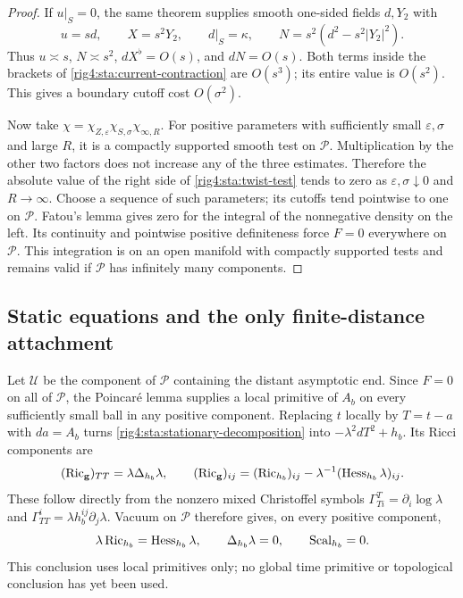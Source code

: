 \begin{proof}
If $u|_S=0$, the same theorem supplies smooth one-sided fields
$d,Y_2$ with
\begin{equation}\label{rig4:sta:zero-lapse-collar}
 u=sd,\qquad X=s^2Y_2,\qquad d|_S=\kappa,
 \qquad N=s^2(d^2-s^2|Y_2|^2).
\end{equation}
Thus $u\asymp s$, $N\asymp s^2$, $dX^\flat=O(s)$, and
$dN=O(s)$. Both terms inside the brackets of
\eqref{rig4:sta:current-contraction} are $O(s^3)$; its entire value is
$O(s^2)$. This gives a boundary cutoff cost $O(\sigma^2)$.

Now take
$\chi=\chi_{Z,\varepsilon}\chi_{S,\sigma}\chi_{\infty,R}$.
For positive parameters with sufficiently small $\varepsilon,\sigma$
and large $R$, it is a compactly supported smooth test on
$\mathcal P$. Multiplication by the other two factors does not
increase any of the three estimates. Therefore the absolute value
of the right side of \eqref{rig4:sta:twist-test} tends to zero as
$\varepsilon,\sigma\downarrow0$ and $R\to\infty$. Choose a sequence
of such parameters; its cutoffs tend pointwise to one on
$\mathcal P$. Fatou's lemma gives zero for the integral of the
nonnegative density on the left. Its continuity and pointwise
positive definiteness force $F=0$ everywhere on $\mathcal P$.
This integration is on an open manifold with compactly supported
tests and remains valid if $\mathcal P$ has infinitely many
components.
\end{proof}

\subsection{Static equations and the only finite-distance attachment}

Let $\mathcal U$ be the component of $\mathcal P$ containing the
distant asymptotic end. Since $F=0$ on all of $\mathcal P$, the
Poincar\'e lemma supplies a local primitive of $A_b$ on every
sufficiently small ball in any positive component. Replacing $t$ locally
by $T=t-a$ with $da=A_b$ turns
\eqref{rig4:sta:stationary-decomposition} into
$-\lambda^2dT^2+h_b$. Its Ricci components are
\[
 (\operatorname{Ric}_{\mathbf g})_{TT}=\lambda\Delta_{h_b}\lambda,
 \qquad
 (\operatorname{Ric}_{\mathbf g})_{ij}
      =(\operatorname{Ric}_{h_b})_{ij}-\lambda^{-1}(\operatorname{Hess}_{h_b}\lambda)_{ij}.
\]
These follow directly from the nonzero mixed Christoffel symbols
$\Gamma^T_{Ti}=\partial_i\log\lambda$ and
$\Gamma^i_{TT}=\lambda h_b^{ij}\partial_j\lambda$.
Vacuum on $\mathcal P$ therefore gives, on every positive component,
\begin{equation}\label{rig4:sta:static-equations}
 \lambda\operatorname{Ric}_{h_b}=\operatorname{Hess}_{h_b}\lambda,
 \qquad \Delta_{h_b}\lambda=0,
 \qquad \operatorname{Scal}_{h_b}=0.
\end{equation}
This conclusion uses local primitives only; no global time primitive
or topological conclusion has yet been used.

